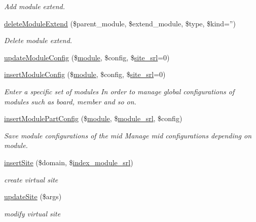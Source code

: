 \begin{DoxyCompactItemize}
\begin{DoxyCompactList}\small\item\em Add module extend. \end{DoxyCompactList}\item 
\hyperlink{classmoduleController_a74f94763f4e60fef8a0e4e4dabf777e0}{delete\+Module\+Extend} (\$parent\+\_\+module, \$extend\+\_\+module, \$type, \$kind='')
\begin{DoxyCompactList}\small\item\em Delete module extend. \end{DoxyCompactList}\item 
\hyperlink{classmoduleController_aa6d6239d1fd7c1f64f7061778ad4127b}{update\+Module\+Config} (\$\hyperlink{classmodule}{module}, \$config, \$\hyperlink{ko_8install_8php_a8b1406b4ad1048041558dce6bfe89004}{site\+\_\+srl}=0)
\item 
\hyperlink{classmoduleController_a678c87caaf6b2d12e63237d87b11b7a9}{insert\+Module\+Config} (\$\hyperlink{classmodule}{module}, \$config, \$\hyperlink{ko_8install_8php_a8b1406b4ad1048041558dce6bfe89004}{site\+\_\+srl}=0)
\begin{DoxyCompactList}\small\item\em Enter a specific set of modules In order to manage global configurations of modules such as board, member and so on. \end{DoxyCompactList}\item 
\hyperlink{classmoduleController_a7def19c7b7f3f3e0d97a2183d58d62eb}{insert\+Module\+Part\+Config} (\$\hyperlink{classmodule}{module}, \$\hyperlink{ko_8install_8php_a370bb6450fab1da3e0ed9f484a38b761}{module\+\_\+srl}, \$config)
\begin{DoxyCompactList}\small\item\em Save module configurations of the mid Manage mid configurations depending on module. \end{DoxyCompactList}\item 
\hyperlink{classmoduleController_acca9e2ce3fbb24f614816bb4c34a5506}{insert\+Site} (\$domain, \$\hyperlink{ko_8install_8php_acd0b17bfe6d14c82871d73fa39c9c22d}{index\+\_\+module\+\_\+srl})
\begin{DoxyCompactList}\small\item\em create virtual site \end{DoxyCompactList}\item 
\hyperlink{classmoduleController_ae2fb61c8a558f0552202c51d2055eede}{update\+Site} (\$args)
\begin{DoxyCompactList}\small\item\em modify virtual site \end{DoxyCompactList}\item 

\end{DoxyCompactItemize}

